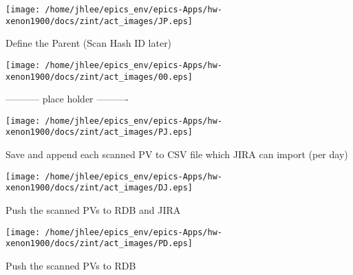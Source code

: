 \noindent
\vspace{1.4cm}
\begin{minipage}{.2\textwidth}
\begin{center}
\texttt{[image: /home/jhlee/epics\_env/epics-Apps/hw-xenon1900/docs/zint/act\_images/JP.eps]}
\end{center}
\end{minipage}
\begin{minipage}{.7\textwidth}
Define the Parent (Scan Hash ID later)
\end{minipage}


\noindent
\vspace{1.4cm}
\begin{minipage}{.2\textwidth}
\begin{center}
\texttt{[image: /home/jhlee/epics\_env/epics-Apps/hw-xenon1900/docs/zint/act\_images/00.eps]}
\end{center}
\end{minipage}
\begin{minipage}{.7\textwidth}
----------- place holder ----------
\end{minipage}


\noindent
\vspace{1.4cm}
\begin{minipage}{.2\textwidth}
\begin{center}
\texttt{[image: /home/jhlee/epics\_env/epics-Apps/hw-xenon1900/docs/zint/act\_images/PJ.eps]}
\end{center}
\end{minipage}
\begin{minipage}{.7\textwidth}
Save and append each scanned PV to CSV file which JIRA can import  (per day)
\end{minipage}


\noindent
\vspace{1.4cm}
\begin{minipage}{.2\textwidth}
\begin{center}
\texttt{[image: /home/jhlee/epics\_env/epics-Apps/hw-xenon1900/docs/zint/act\_images/DJ.eps]}
\end{center}
\end{minipage}
\begin{minipage}{.7\textwidth}
Push the scanned PVs to RDB and JIRA
\end{minipage}


\noindent
\vspace{1.4cm}
\begin{minipage}{.2\textwidth}
\begin{center}
\texttt{[image: /home/jhlee/epics\_env/epics-Apps/hw-xenon1900/docs/zint/act\_images/PD.eps]}
\end{center}
\end{minipage}
\begin{minipage}{.7\textwidth}
Push the scanned PVs to RDB
\end{minipage}


